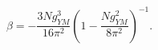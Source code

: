 \begin{equation}
\beta=-\frac{3Ng_{YM}^3}{16\pi^2}(1-\frac{Ng_{YM}^2}{8\pi^2})^{-1}.
\label{NSVZtor}\end{equation}


